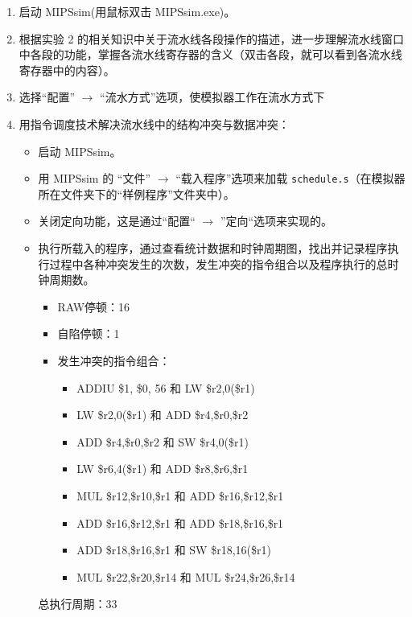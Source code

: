 \documentclass[blue,normal,cn]{elegantnote}
\newcommand{\code}[1]{\colorbox{light-gray}{\texttt{#1}}}
\begin{document}
\begin{enumerate}[wide=0pt, listparindent=2em, parsep=0pt]
  \item 启动 MIPSsim(用鼠标双击 MIPSsim.exe)。
  \item 根据实验 2 的相关知识中关于流水线各段操作的描述，进一步理解流水线窗口中各段的功能，掌握各流水线寄存器的含义（双击各段，就可以看到各流水线寄存器中的内容）。
  \item 选择“配置” $\rightarrow$ “流水方式”选项，使模拟器工作在流水方式下
  \item 用指令调度技术解决流水线中的结构冲突与数据冲突：

        \begin{itemize}[leftmargin=3em, listparindent=2em, parsep=0pt]
          \item 启动 MIPSsim。
          \item 用 MIPSsim 的 “文件” $\rightarrow$ “载入程序”选项来加载 \code{schedule.s}（在模拟器所在文件夹下的“样例程序”文件夹中）。
          \item 关闭定向功能，这是通过“配置“ $\rightarrow$ ”定向“选项来实现的。
          \item  执行所载入的程序，通过查看统计数据和时钟周期图，找出并记录程序执行过程中各种冲突发生的次数，发生冲突的指令组合以及程序执行的总时钟周期数。

                \textcolor{ans}{
                  \begin{itemize}[leftmargin=3em, listparindent=2em, parsep=0pt]
                    \item RAW停顿：16
                    \item 自陷停顿：1
                    \item 发生冲突的指令组合：
                          \begin{itemize}[leftmargin=3em]
                            \item ADDIU \$1, \$0, 56 和 LW \$r2,0(\$r1)
                            \item LW \$r2,0(\$r1) 和 ADD \$r4,\$r0,\$r2
                            \item ADD \$r4,\$r0,\$r2 和 SW \$r4,0(\$r1)
                            \item LW \$r6,4(\$r1) 和 ADD \$r8,\$r6,\$r1
                            \item MUL \$r12,\$r10,\$r1 和 ADD \$r16,\$r12,\$r1
                            \item ADD \$r16,\$r12,\$r1 和 ADD \$r18,\$r16,\$r1
                            \item ADD \$r18,\$r16,\$r1 和 SW \$r18,16(\$r1)
                            \item MUL \$r22,\$r20,\$r14 和 MUL \$r24,\$r26,\$r14
                          \end{itemize}
                  \end{itemize}
                }
                \textcolor{ans}{总执行周期：33}


\end{itemize}
\end{enumerate}
\end{document}
